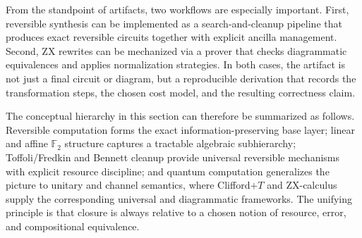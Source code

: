 From the standpoint of artifacts, two workflows are especially important. First, reversible synthesis can be implemented as a search-and-cleanup pipeline that produces exact reversible circuits together with explicit ancilla management. Second, ZX rewrites can be mechanized via a prover that checks diagrammatic equivalences and applies normalization strategies. In both cases, the artifact is not just a final circuit or diagram, but a reproducible derivation that records the transformation steps, the chosen cost model, and the resulting correctness claim.

The conceptual hierarchy in this section can therefore be summarized as follows. Reversible computation forms the exact information-preserving base layer; linear and affine \(\mathbb{F}_2\) structure captures a tractable algebraic subhierarchy; Toffoli/Fredkin and Bennett cleanup provide universal reversible mechanisms with explicit resource discipline; and quantum computation generalizes the picture to unitary and channel semantics, where Clifford\(+T\) and ZX-calculus supply the corresponding universal and diagrammatic frameworks. The unifying principle is that closure is always relative to a chosen notion of resource, error, and compositional equivalence.
